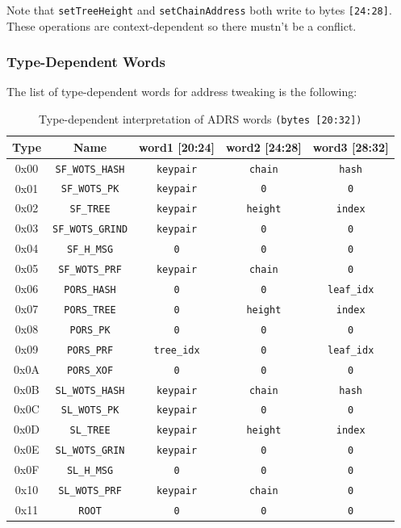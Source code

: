Note that \texttt{setTreeHeight} and \texttt{setChainAddress} both write to bytes \texttt{[24:28]}. These operations are context-dependent so there mustn't be a conflict.

\subsubsection{Type-Dependent Words}
The list of type-dependent words for address tweaking is the following:
\begin{table}[h!]
\centering
\begin{tabular}{c c c c c}
\hline
\textbf{Type} & \textbf{Name} & \textbf{word1 [20:24]} & \textbf{word2 [24:28]} & \textbf{word3 [28:32]} \\
\hline

0x00 & \texttt{SF\_WOTS\_HASH}   & \texttt{keypair}   & \texttt{chain}   & \texttt{hash} \\
0x01 & \texttt{SF\_WOTS\_PK}     & \texttt{keypair}   & \texttt{0}       & \texttt{0} \\
0x02 & \texttt{SF\_TREE}         & \texttt{keypair}   & \texttt{height}  & \texttt{index} \\
0x03 & \texttt{SF\_WOTS\_GRIND}  & \texttt{keypair}   & \texttt{0}       & \texttt{0} \\
0x04 & \texttt{SF\_H\_MSG}       & \texttt{0}         & \texttt{0}       & \texttt{0} \\
0x05 & \texttt{SF\_WOTS\_PRF}    & \texttt{keypair}   & \texttt{chain}   & \texttt{0} \\
0x06 & \texttt{PORS\_HASH}       & \texttt{0}         & \texttt{0}       & \texttt{leaf\_idx} \\
0x07 & \texttt{PORS\_TREE}       & \texttt{0}         & \texttt{height}  & \texttt{index} \\
0x08 & \texttt{PORS\_PK}         & \texttt{0}         & \texttt{0}       & \texttt{0} \\
0x09 & \texttt{PORS\_PRF}        & \texttt{tree\_idx} & \texttt{0}       & \texttt{leaf\_idx} \\
0x0A & \texttt{PORS\_XOF}        & \texttt{0}         & \texttt{0}       & \texttt{0} \\
0x0B & \texttt{SL\_WOTS\_HASH}   & \texttt{keypair}   & \texttt{chain}   & \texttt{hash} \\
0x0C & \texttt{SL\_WOTS\_PK}     & \texttt{keypair}   & \texttt{0}       & \texttt{0} \\
0x0D & \texttt{SL\_TREE}         & \texttt{keypair}   & \texttt{height}  & \texttt{index} \\
0x0E & \texttt{SL\_WOTS\_GRIN}   & \texttt{keypair}   & \texttt{0}       & \texttt{0} \\
0x0F & \texttt{SL\_H\_MSG}       & \texttt{0}         & \texttt{0}       & \texttt{0} \\
0x10 & \texttt{SL\_WOTS\_PRF}    & \texttt{keypair}   & \texttt{chain}   & \texttt{0} \\
0x11 & \texttt{ROOT}             & \texttt{0}         & \texttt{0}       & \texttt{0} \\

\hline
\end{tabular}
\caption{Type-dependent interpretation of ADRS words \texttt{(bytes [20:32])}}
\end{table}